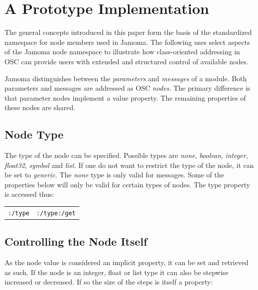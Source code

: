 \documentclass{NIME-alternate}
\begin{document}
\section{A Prototype Implementation} %
\label{sec:prototype_implementation}

The general concepts introduced in this paper form the basis of the standardized namespace for node members used in Jamoma. The following uses select aspects of the Jamoma node namespace to illustrate how class-oriented addressing in OSC can provide users with extended and structured control of available nodes.

Jamoma distinguishes between the \emph{parameters} and \emph{messages} of a module.  Both parameters and messages are addressed as OSC \emph{nodes}. The primary difference is that parameter nodes implement a value property.  The remaining properties of these nodes are shared.



\subsection{Node Type} %
\label{sub:type}

The type of the node can be specified. Possible types are \emph{none}, \emph{boolean}, \emph{integer}, \emph{float32}, \emph{symbol} and \emph{list}. If one do not want to restrict the type of the node, it can be set to \emph{generic}. The \emph{none} type is only valid for messages. Some of the properties below will only be valid for certain types of nodes. The type property is accessed thus:

\begin{tabular}{ll}
	\texttt{:/type} & \texttt{:/type:/get} \\
\end{tabular}




\subsection{Controlling the Node Itself} %
\label{sub:controlling_the_node_itself}

As the node value is considered an implicit property, it can be set and retrieved as such. If the node is an integer, float or list type it can also be stepwise increased or decreased. If so the size of the steps is itself a property:
\end{document}
